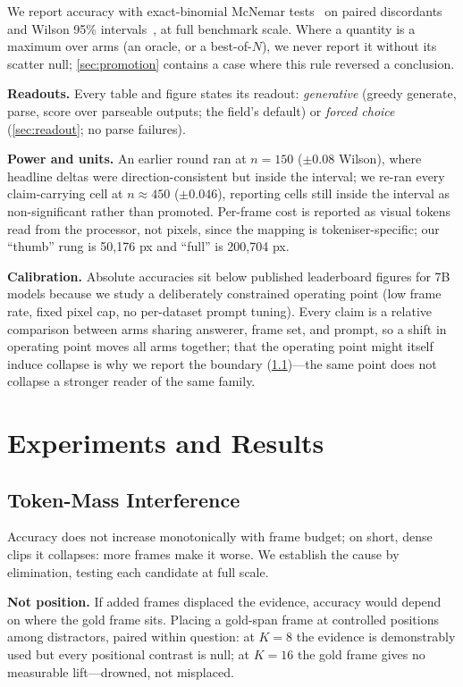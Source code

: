 \documentclass[10pt,twocolumn,letterpaper]{article}
\begin{document}
We report accuracy with exact-binomial McNemar tests~\cite{mcnemar1947} on paired discordants and Wilson 95\% intervals~\cite{wilson1927}, at full benchmark scale. Where a quantity is a maximum over arms (an oracle, or a best-of-$N$), we never report it without its scatter null; \cref{sec:promotion} contains a case where this rule reversed a conclusion.

\noindent\textbf{Readouts.} Every table and figure states its readout: \emph{generative} (greedy generate, parse, score over parseable outputs; the field's default) or \emph{forced choice} (\cref{sec:readout}; no parse failures).

\noindent\textbf{Power and units.} An earlier round ran at $n{=}150$ ($\pm0.08$ Wilson), where headline deltas were direction-consistent but inside the interval; we re-ran every claim-carrying cell at $n{\approx}450$ ($\pm0.046$), reporting cells still inside the interval as non-significant rather than promoted. Per-frame cost is reported as visual tokens read from the processor, not pixels, since the mapping is tokeniser-specific; our ``thumb'' rung is 50,176 px and ``full'' is 200,704 px.

\noindent\textbf{Calibration.} Absolute accuracies sit below published leaderboard figures for 7B models because we study a deliberately constrained operating point (low frame rate, fixed pixel cap, no per-dataset prompt tuning). Every claim is a relative comparison between arms sharing answerer, frame set, and prompt, so a shift in operating point moves all arms together; that the operating point might itself induce collapse is why we report the boundary (\cref{sec:interference})---the same point does not collapse a stronger reader of the same family.

\section{Experiments and Results}
\label{sec:experiments}

\subsection{Token-Mass Interference}
\label{sec:interference}

Accuracy does not increase monotonically with frame budget; on short, dense clips it collapses: more frames make it worse. We establish the cause by elimination, testing each candidate at full scale.

\noindent\textbf{Not position.} If added frames displaced the evidence, accuracy would depend on where the gold frame sits. Placing a gold-span frame at controlled positions among distractors, paired within question: at $K{=}8$ the evidence is demonstrably used but every positional contrast is null; at $K{=}16$ the gold frame gives no measurable lift---drowned, not misplaced.
\end{document}
